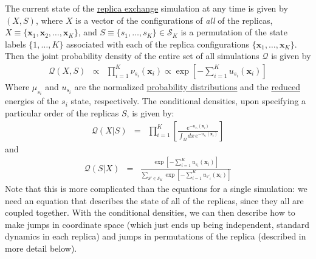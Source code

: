 \documentclass[9pt,review]{livecoms}
\newcommand{\vx}{\mathbf{x}}
\begin{document}
The current state of the \hyperlink{ref:ReplEx} {replica exchange} simulation at any time is given by $(X,S)$, where $X$ is a vector of the configurations of \emph{all} of the replicas, $X \equiv \{\vx_1, \vx_2, \ldots, \vx_K\}$, and $S \equiv\{s_1,\ldots,s_K\} \in \mathcal{S}_K$ is a permutation of the state labels $\{1, \ldots, K\}$ associated with each of the replica configurations $\{\vx_1, \ldots, \vx_K\}$. Then the joint probability density of the entire set of all simulations $\mathcal{Q}$ is given by
\begin{eqnarray}
\mathcal{Q}(X, S) &\propto& \prod_{i=1}^{K} \nu_{s_i}(\vx_i) \propto \exp\left[-\sum_{i=1}^K u_{s_i}(\vx_i)\right]
\label{eq:parallereplica}
\end{eqnarray}
Where $\mu_{s_i}$ and $u_{s_i}$ are the normalized \hyperlink{ref:Distribution}{probability distributions} and the \hyperlink{ref:reduced}{reduced} energies of the $s_i$ state, respectively.
The conditional densities, upon specifying a particular order of the replicas $S$, is given by:
\begin{eqnarray}
\mathcal{Q}(X | S) &=& \prod_{i=1}^K \left[ \frac{e^{-u_{s_i}(\vx_i)}}{\int_\Omega dx \, e^{-u_{s_i}(\vx_i)}}\right]
\end{eqnarray}
and
\begin{eqnarray}
\mathcal{Q}(S | X) &=& \frac{\exp\left[- \sum\limits_{i=1}^K u_{s_i}(\vx_i) \right]}{\sum\limits_{S' \in \mathcal{S}_K} \exp\left[- \sum\limits_{i=1}^K u_{s'_i}(\vx_i) \right]}
\end{eqnarray}
Note that this is more complicated than the equations for a single simulation: we need an equation that describes the state of all of the replicas, since they all are coupled together. With the conditional densities, we can then describe how to make jumps in coordinate space (which just ends up being independent, standard dynamics in each replica) and jumps in permutations of the replica (described in more detail below).
\end{document}
